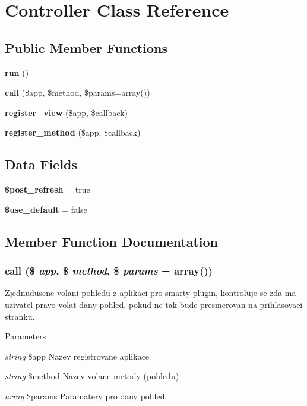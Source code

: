 \section{Controller Class Reference}
\label{class_controller}
\subsection*{Public Member Functions}
\begin{DoxyCompactItemize}
\item 
{\bf run} ()
\item 
{\bf call} (\$app, \$method, \$params=array())
\item 
{\bfseries register\_\-view} (\$app, \$callback)\label{class_controller_a3fc2884eb21d9e131b5cf6cf67933b32}

\item 
{\bfseries register\_\-method} (\$app, \$callback)\label{class_controller_ab8f19c8e0644dfca30439771599db37f}

\end{DoxyCompactItemize}
\subsection*{Data Fields}
\begin{DoxyCompactItemize}
\item 
{\bfseries \$post\_\-refresh} = true\label{class_controller_a8a59b03c764cd53a7ad5bdf4461caebb}

\item 
{\bfseries \$use\_\-default} = false\label{class_controller_afbd7e0101257bd5afcf70f0ea331e30a}

\end{DoxyCompactItemize}


\subsection{Member Function Documentation}
\subsubsection[{call}]{\setlength{\rightskip}{0pt plus 5cm}call (\$ {\em app}, \/  \$ {\em method}, \/  \$ {\em params} = {\ttfamily array()})}\label{class_controller_aeaf0df229f460bc4171c34710ca7e301}
Zjednudusene volani pohledu z aplikaci pro smarty plugin, kontroluje se zda ma uzivatel pravo volat dany pohled, pokud ne tak bude presmerovan na prihlasovaci stranku. 
\begin{DoxyParams}{Parameters}
\item[{\em string}]\$app Nazev registrovane aplikace \item[{\em string}]\$method Nazev volane metody (pohledu) \item[{\em array}]\$params Paramatery pro dany pohled \end{DoxyParams}

